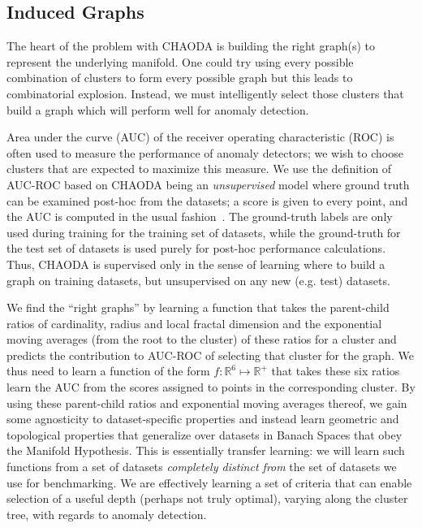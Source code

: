 \subsection{Induced Graphs}
\label{subsec:methods:induced-graphs}

The heart of the problem with CHAODA is building the right graph(s) to represent the underlying manifold.
One could try using every possible combination of clusters to form every possible graph but this leads to combinatorial explosion.
Instead, we must intelligently select those clusters that build a graph which will perform well for anomaly detection.

Area under the curve (AUC) of the receiver operating characteristic (ROC) is often used to measure the performance of anomaly detectors;
we wish to choose clusters that are expected to maximize this measure.
We use the definition of AUC-ROC based on CHAODA being an \emph{unsupervised} model where ground truth can be examined post-hoc from the datasets; a score is given to every point, and the AUC is computed in the usual fashion~\cite{fawcett2006introduction}.
The ground-truth labels are only used during training for the training set of datasets, while the ground-truth for the test set of datasets is used purely for post-hoc performance calculations.
Thus, CHAODA is supervised only in the sense of learning where to build a graph on training datasets, but unsupervised on any new (e.g. test) datasets.

We find the ``right graphs'' by learning a function that takes the parent-child ratios of cardinality, radius and local fractal dimension and the exponential moving averages (from the root to the cluster) of these ratios for a cluster and predicts the contribution to AUC-ROC of selecting that cluster for the graph.
We thus need to learn a function of the form $f: \mathbb{R}^6 \mapsto \mathbb{R}^+$ that takes these six ratios learn the AUC from the scores assigned to points in the corresponding cluster.
By using these parent-child ratios and exponential moving averages thereof, we gain some agnosticity to dataset-specific properties and instead learn geometric and topological properties that generalize over datasets in Banach Spaces that obey the Manifold Hypothesis.
This is essentially transfer learning: we will learn such functions from a set of datasets \emph{completely distinct from} the set of datasets we use for benchmarking.
We are effectively learning a set of criteria that can enable selection of a useful depth (perhaps not truly optimal), varying along the cluster tree, with regards to anomaly detection.

